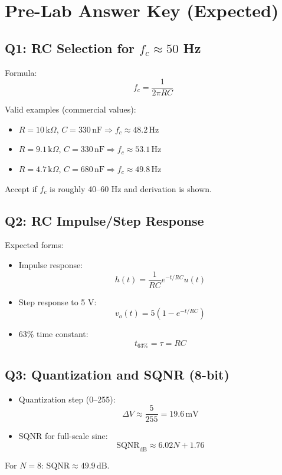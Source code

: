\documentclass[11pt,letterpaper]{article}
\begin{document}
\section{Pre-Lab Answer Key (Expected)}

\subsection*{Q1: RC Selection for $f_c \approx 50$ Hz}
Formula:
\[
f_c = \frac{1}{2\pi RC}
\]

Valid examples (commercial values):
\begin{itemize}[leftmargin=1.2em]
    \item $R = 10\,\text{k}\Omega$, $C = 330\,\text{nF} \Rightarrow f_c \approx 48.2\,\text{Hz}$
    \item $R = 9.1\,\text{k}\Omega$, $C = 330\,\text{nF} \Rightarrow f_c \approx 53.1\,\text{Hz}$
    \item $R = 4.7\,\text{k}\Omega$, $C = 680\,\text{nF} \Rightarrow f_c \approx 49.8\,\text{Hz}$
\end{itemize}
Accept if $f_c$ is roughly 40--60 Hz and derivation is shown.

\subsection*{Q2: RC Impulse/Step Response}
Expected forms:
\begin{itemize}[leftmargin=1.2em]
    \item Impulse response:
    \[
    h(t) = \frac{1}{RC}e^{-t/RC}u(t)
    \]
    \item Step response to 5 V:
    \[
    v_o(t) = 5\left(1-e^{-t/RC}\right)
    \]
    \item 63\% time constant:
    \[
    t_{63\%} = \tau = RC
    \]
\end{itemize}

\subsection*{Q3: Quantization and SQNR (8-bit)}
\begin{itemize}[leftmargin=1.2em]
    \item Quantization step (0--255):
    \[
    \Delta V \approx \frac{5}{255} = 19.6\,\text{mV}
    \]
    \item SQNR for full-scale sine:
    \[
    \text{SQNR}_{\text{dB}} \approx 6.02N + 1.76
    \]
\end{itemize}
For $N=8$: $\text{SQNR} \approx 49.9\,\text{dB}$.
\end{document}
